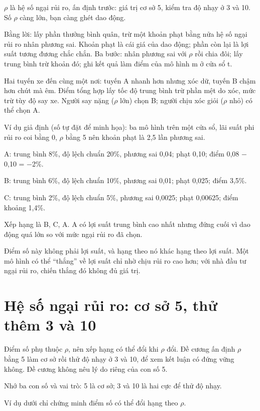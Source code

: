 \(\rho\) là hệ số ngại rủi ro, ấn định trước: giá trị cơ sở 5, kiểm tra độ nhạy ở 3 và 10. Số \(\rho\) càng lớn, bạn càng ghét dao động.

Bằng lời: lấy phần thưởng bình quân, trừ một khoản phạt bằng nửa hệ số ngại rủi ro nhân phương sai. Khoản phạt là cái giá của dao động; phần còn lại là lợi suất tương đương chắc chắn. Ba bước: nhân phương sai với \(\rho\) rồi chia đôi; lấy trung bình trừ khoản đó; ghi kết quả làm điểm của mô hình m ở cửa sổ t.

Hai tuyến xe đến cùng một nơi: tuyến A nhanh hơn nhưng xóc dữ, tuyến B chậm hơn chút mà êm. Điểm tổng hợp lấy tốc độ trung bình trừ phần mệt do xóc, mức trừ tùy độ say xe. Người say nặng (\(\rho\) lớn) chọn B; người chịu xóc giỏi (\(\rho\) nhỏ) có thể chọn A.

\begin{tcolorbox}[breakable]
Ví dụ giả định (số tự đặt để minh họa): ba mô hình trên một cửa sổ, lãi suất phi rủi ro coi bằng 0, \(\rho\) bằng 5 nên khoản phạt là 2,5 lần phương sai.

A: trung bình 8\%, độ lệch chuẩn 20\%, phương sai 0,04; phạt 0,10; điểm 0,08 − 0,10 = −2\%.

B: trung bình 6\%, độ lệch chuẩn 10\%, phương sai 0,01; phạt 0,025; điểm 3,5\%.

C: trung bình 2\%, độ lệch chuẩn 5\%, phương sai 0,0025; phạt 0,00625; điểm khoảng 1,4\%.

Xếp hạng là B, C, A. A có lợi suất trung bình cao nhất nhưng đứng cuối vì dao động quá lớn so với mức ngại rủi ro đã chọn.
\end{tcolorbox}

Điểm số này không phải lợi suất, và hạng theo nó khác hạng theo lợi suất. Một mô hình có thể “thắng” về lợi suất chỉ nhờ chịu rủi ro cao hơn; với nhà đầu tư ngại rủi ro, chiến thắng đó không đủ giá trị.

\section{Hệ số ngại rủi ro: cơ sở 5, thử thêm 3 và 10}

Điểm số phụ thuộc \(\rho\), nên xếp hạng có thể đổi khi \(\rho\) đổi. Đề cương ấn định \(\rho\) bằng 5 làm cơ sở rồi thử độ nhạy ở 3 và 10, để xem kết luận có đứng vững không. Đề cương không nêu lý do riêng của con số 5.

Nhớ ba con số và vai trò: 5 là cơ sở; 3 và 10 là hai cực để thử độ nhạy.

Ví dụ dưới chỉ chứng minh điểm số có thể đổi hạng theo \(\rho\).

